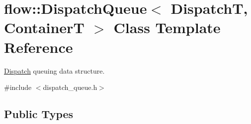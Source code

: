 \hypertarget{classflow_1_1_dispatch_queue}{}\section{flow\+:\+:Dispatch\+Queue$<$ DispatchT, ContainerT $>$ Class Template Reference}
\label{classflow_1_1_dispatch_queue}


\hyperlink{classflow_1_1_dispatch}{Dispatch} queuing data structure.  




{\ttfamily \#include $<$dispatch\+\_\+queue.\+h$>$}

\subsection*{Public Types}
